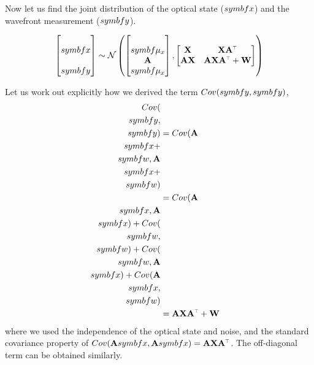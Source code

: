 \documentclass[SE,authoryear,toc]{lsstdoc}
\renewcommand{\v}[1]{\mathbf{#1}}
\newcommand{\tr}{\scalebox{0.6}{$\top$}}
\begin{document}
Now let us find the joint distribution of the optical state ($\\symbf{x}$) and the wavefront measurement ($\\symbf{y}$). 

\begin{equation}
    \begin{bmatrix}
        \\symbf{x} \\
        \\symbf{y}
    \end{bmatrix}
    \sim \mathcal{N} \left(
    \begin{bmatrix}
        \\symbf{\mu_x} \\
        \v{A}\\symbf{\mu_x}
    \end{bmatrix},
    \begin{bmatrix}
        \v{X} & \v{X}\v{A}^{\tr} \\
        \v{A}\v{X} & \v{A}\v{X}\v{A}^{\tr} + \v{W}
    \end{bmatrix}
    \right) 
\end{equation}

Let us work out explicitly how we derived the term $Cov(\\symbf{y}, \\symbf{y})$,
\begin{equation}\label{eq14}
\begin{split}
    Cov(\\symbf{y}, \\symbf{y}) & = Cov(\v{A}\\symbf{x} + \\symbf{w}, \v{A}\\symbf{x} + \\symbf{w}) \\ 
    & = Cov(\v{A}\\symbf{x}, \v{A}\\symbf{x}) + Cov(\\symbf{w}, \\symbf{w}) + Cov(\\symbf{w}, \v{A}\\symbf{x}) + Cov(\v{A}\\symbf{x}, \\symbf{w}) \\ 
    &= \v{A}\v{X}\v{A}^{\tr} + \v{W}
\end{split}
\end{equation}
where we used the independence of the optical state and noise, and the standard covariance property of $Cov(\v{A}\\symbf{x}, \v{A}\\symbf{x}) = \v{A}\v{X}\v{A}^{\tr}$. The off-diagonal term can be obtained similarly. 
\end{document}
